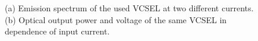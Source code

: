 	\begin{figure}[tp]
		\begin{subfigure}[t]{ 0.49\linewidth}
			\centering
			\caption{}
			\label{subfig::vcsel_output_wavelength}
		\end{subfigure}
		\hfill
		\begin{subfigure}[t]{ 0.49\linewidth}
			\centering
			\caption{}
			\label{subfig::vcsel_output_power}
		\end{subfigure}
		\caption{(a) Emission spectrum of the used VCSEL at two different currents. (b) Optical output power and voltage of the same VCSEL in dependence of input current. \cite{}}
	\end{figure}

